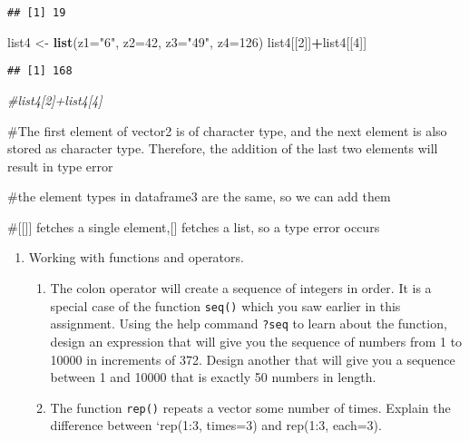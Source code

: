 \documentclass[
]{article}
\newenvironment{Shaded}{\begin{snugshade}}{\end{snugshade}}
\newcommand{\CommentTok}[1]{\textcolor[rgb]{0.56,0.35,0.01}{\textit{#1}}}
\newcommand{\DataTypeTok}[1]{\textcolor[rgb]{0.13,0.29,0.53}{#1}}
\newcommand{\DecValTok}[1]{\textcolor[rgb]{0.00,0.00,0.81}{#1}}
\newcommand{\KeywordTok}[1]{\textcolor[rgb]{0.13,0.29,0.53}{\textbf{#1}}}
\newcommand{\NormalTok}[1]{#1}
\newcommand{\OperatorTok}[1]{\textcolor[rgb]{0.81,0.36,0.00}{\textbf{#1}}}
\newcommand{\StringTok}[1]{\textcolor[rgb]{0.31,0.60,0.02}{#1}}
\providecommand{\tightlist}{%
  \setlength{\itemsep}{0pt}\setlength{\parskip}{0pt}}
\begin{document}
\begin{verbatim}
## [1] 19
\end{verbatim}

\begin{Shaded}
\begin{Highlighting}[]
\NormalTok{list4 <-}\StringTok{ }\KeywordTok{list}\NormalTok{(}\DataTypeTok{z1=}\StringTok{"6"}\NormalTok{, }\DataTypeTok{z2=}\DecValTok{42}\NormalTok{, }\DataTypeTok{z3=}\StringTok{"49"}\NormalTok{, }\DataTypeTok{z4=}\DecValTok{126}\NormalTok{)}
\NormalTok{list4[[}\DecValTok{2}\NormalTok{]]}\OperatorTok{+}\NormalTok{list4[[}\DecValTok{4}\NormalTok{]]}
\end{Highlighting}
\end{Shaded}

\begin{verbatim}
## [1] 168
\end{verbatim}

\begin{Shaded}
\begin{Highlighting}[]
\CommentTok{#list4[2]+list4[4]}
\end{Highlighting}
\end{Shaded}

\#The first element of vector2 is of character type, and the next
element is also stored as character type. Therefore, the addition of the
last two elements will result in type error

\#the element types in dataframe3 are the same, so we can add them

\#{[}{[}{]}{]} fetches a single element,{[}{]} fetches a list, so a type
error occurs

\begin{enumerate}
\def\labelenumi{\arabic{enumi}.}
\setcounter{enumi}{2}
\tightlist
\item
  Working with functions and operators.

  \begin{enumerate}
  \def\labelenumii{\alph{enumii}.}
  \tightlist
  \item
    The colon operator will create a sequence of integers in order. It
    is a special case of the function \texttt{seq()} which you saw
    earlier in this assignment. Using the help command \texttt{?seq} to
    learn about the function, design an expression that will give you
    the sequence of numbers from 1 to 10000 in increments of 372. Design
    another that will give you a sequence between 1 and 10000 that is
    exactly 50 numbers in length.
  \item
    The function \texttt{rep()} repeats a vector some number of times.
    Explain the difference between `rep(1:3, times=3) and rep(1:3,
    each=3).
  \end{enumerate}
\end{enumerate}
\end{document}
